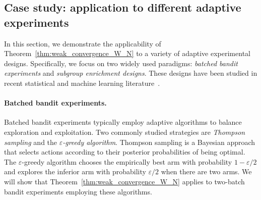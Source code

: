 \documentclass[12pt]{article}
\newcommand{\zr}[1]{\textcolor{red}{[ZR: #1]}}
\begin{document}


\subsection{Case study: application to different adaptive experiments}\label{sec:application}

In this section, we demonstrate the applicability of Theorem~\ref{thm:weak_convergence_W_N} to a variety of adaptive experimental designs. Specifically, we focus on two widely used paradigms: \emph{batched bandit experiments} and \emph{subgroup enrichment designs}. These designs have been studied in recent statistical and machine learning literature~\citep{russo2016simple,lin2021inference,che2024optimization,freidling2024selective}.

\paragraph{Batched bandit experiments.}

Batched bandit experiments typically employ adaptive algorithms to balance exploration and exploitation. Two commonly studied strategies are \emph{Thompson sampling} and the \emph{$\varepsilon$-greedy algorithm}. Thompson sampling is a Bayesian approach that selects actions according to their posterior probabilities of being optimal. The $\varepsilon$-greedy algorithm chooses the empirically best arm with probability $1 - \varepsilon/2$ and explores the inferior arm with probability $\varepsilon/2$ when there are two arms. We will show that Theorem~\ref{thm:weak_convergence_W_N} applies to two-batch bandit experiments employing these algorithms.
\end{document}
